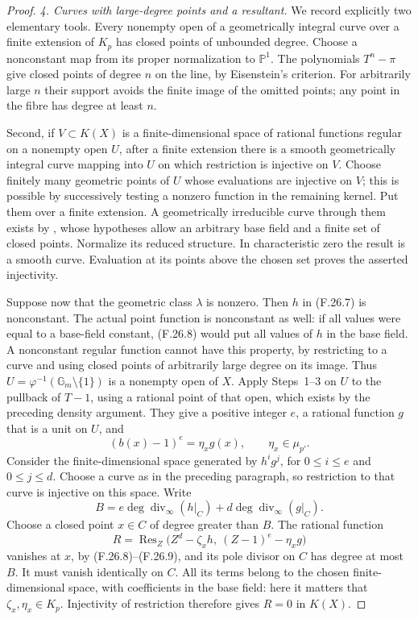 \documentclass[11pt]{article}
\begin{document}
\begin{proof}
\emph{4. Curves with large-degree points and a resultant.}
We record explicitly two elementary tools. Every nonempty
open of a geometrically integral curve over a finite
extension of \(K_p\) has closed points of unbounded
degree. Choose a nonconstant map from its proper
normalization to \(\mathbb P^1\). The polynomials
\(T^n-\pi\) give closed points of degree \(n\) on
the line, by Eisenstein's criterion. For arbitrarily
large \(n\) their support avoids the finite image
of the omitted points; any point in the fibre has
degree at least \(n\).

Second, if \(V\subset K(X)\) is a finite-dimensional
space of rational functions regular on a nonempty open
\(U\), after a finite extension there is a smooth
geometrically integral curve mapping into \(U\) on
which restriction is injective on \(V\). Choose finitely
many geometric points of \(U\) whose evaluations are
injective on \(V\); this is possible by successively
testing a nonzero function in the remaining kernel.
Put them over a finite extension. A geometrically
irreducible curve through them exists by
\citet[Theorem~1.8, Corollary~1.9]{FF_CharlesPoonen2016},
whose hypotheses allow an arbitrary base field and
a finite set of closed points. Normalize its reduced
structure. In characteristic zero the result is a
smooth curve. Evaluation at its points above the
chosen set proves the asserted injectivity.

Suppose now that the geometric class \(\lambda\)
is nonzero. Then \(h\) in (F.26.7) is nonconstant.
The actual point function is nonconstant as well:
if all values were equal to a base-field constant,
(F.26.8) would put all values of \(h\) in the
base field. A nonconstant regular function cannot
have this property, by restricting to a curve and
using closed points of arbitrarily large degree
on its image.
Thus \(U=\varphi^{-1}(\mathbb G_m\setminus\{1\})\)
is a nonempty open of \(X\). Apply Steps~1--3 on
\(U\) to the pullback of \(T-1\), using a
rational point of that open, which exists by the preceding
density argument.
They give a positive integer \(e\), a rational
function \(g\) that is a unit on \(U\), and
\[
                     (b(x)-1)^e=\eta_xg(x),
                           \qquad\eta_x\in\mu_{p'}.
                                                               \tag{F.26.9}
\]
Consider the finite-dimensional space generated by
\(h^ig^j\), for \(0\leq i\leq e\) and
\(0\leq j\leq d\). Choose a curve as in the preceding
paragraph, so restriction to that curve is injective
on this space. Write
\[
              B=e\deg\operatorname{div}_\infty(h|_C)
                   +d\deg\operatorname{div}_\infty(g|_C).
\]
Choose a closed point \(x\in C\) of degree greater
than \(B\). The rational function
\[
 R=\operatorname{Res}_Z
       \bigl(Z^d-\zeta_xh,\ (Z-1)^e-\eta_xg\bigr)
                                                               \tag{F.26.10}
\]
vanishes at \(x\), by (F.26.8)--(F.26.9), and
its pole divisor on \(C\) has degree at most \(B\).
It must vanish identically on \(C\). All its terms
belong to the chosen finite-dimensional space, with
coefficients in the base field: here it matters that
\(\zeta_x,\eta_x\in K_p\). Injectivity of restriction
therefore gives \(R=0\) in \(K(X)\).


\end{proof}
\end{document}
